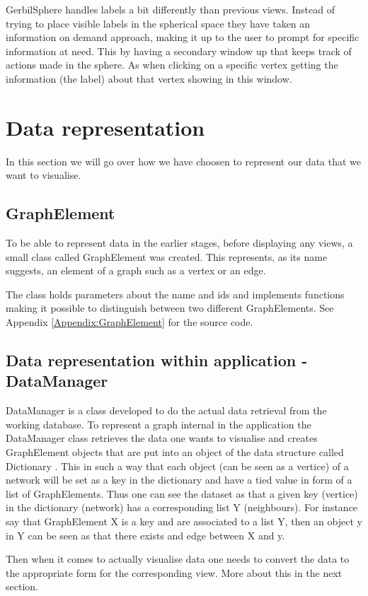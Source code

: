 \documentclass[a4paper,11pt]{kth-mag}
\begin{document}
\begin{appendices}
GerbilSphere handles labels a bit differently than previous views. Instead of trying to place visible labels in the spherical space they have taken an information on demand approach, making it up to the user to prompt for 
specific information at need. This by having a secondary window up that keeps track of actions made in the sphere. As when clicking on a specific vertex getting the information (the label) about that vertex showing in 
this window.
\section{Data representation}
In this section we will go over how we have choosen to represent our data that we want to visualise.
\label{Data-Rep}
\subsection{GraphElement}
To be able to represent data in the earlier stages, before displaying any views, a small class called GraphElement was created. This represents, as its name suggests, an element of a graph such as a vertex or
an edge.

The class holds parameters about the name and ids and implements functions making it possible to distinguish between two different GraphElements. See Appendix \ref{Appendix:GraphElement} for the source code.
\subsection{Data representation within application - DataManager}
DataManager is a class developed to do the actual data retrieval from the working database. To represent a graph internal in the application the DataManager class retrieves the data one wants to visualise and creates
 GraphElement objects that are put into an object of the data structure called Dictionary \cite{website:dictionary}. This in such a way that each object (can be seen as a vertice) of a network will be set as a key in the 
 dictionary and have a tied value in form of a list of GraphElements. Thus one can see the dataset as that a given key (vertice) in the dictionary (network) has a corresponding list Y (neighbours). For instance say that
 GraphElement X is a key and are associated to a list Y, then an object y in Y can be seen as that there exists and edge between X and y.

Then when it comes to actually visualise data one needs to convert the data to the appropriate form for the corresponding view. More about this in the next section.

\end{appendices}
\end{document}
